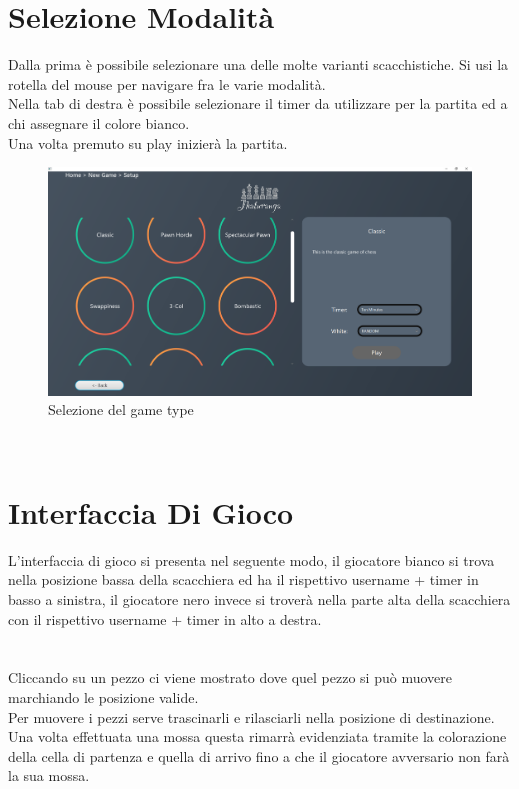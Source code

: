 \documentclass[a4paper,12pt]{report}
\begin{document}
%
\section{Selezione Modalità}
Dalla prima è possibile selezionare una delle molte varianti scacchistiche.
Si usi la rotella del mouse per navigare fra le varie modalità.
\\
Nella tab di destra è possibile selezionare il timer da utilizzare per la partita ed a chi assegnare il colore bianco.
\\
Una volta premuto su play inizierà la partita.

\begin{figure}[H]
    \begin{center}
        \centering
        \includegraphics[scale=0.25]{img/guidaUtente/selezioneGameType.png}
    \end{center}
    \caption{Selezione del game type}
    \label{img:selezioneGameType}
\end{figure}
\
%
\section{Interfaccia Di Gioco}
L'interfaccia di gioco si presenta nel seguente modo, il giocatore bianco si trova nella posizione bassa della scacchiera ed ha il rispettivo username + timer in basso a sinistra, il giocatore nero invece si troverà nella parte alta della scacchiera con il rispettivo username + timer in alto a destra.
\paragraph{}
\
\\
Cliccando su un pezzo ci viene mostrato dove quel pezzo si può muovere marchiando le posizione valide.
\\
Per muovere i pezzi serve trascinarli e rilasciarli nella posizione di destinazione.
\\
Una volta effettuata una mossa questa rimarrà evidenziata tramite la colorazione della cella di partenza e quella di arrivo fino a che il giocatore avversario non farà la sua mossa.
\end{document}
